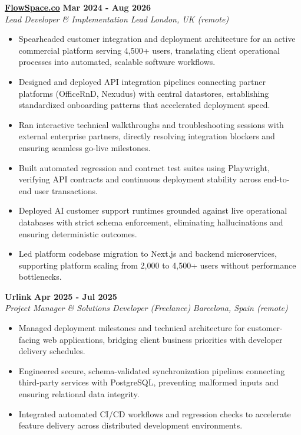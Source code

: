 \documentclass[10pt,a4paper]{article}
\newcommand{\role}[4]{%
  \textbf{#1} \hfill \textbf{#2}\\[1pt]%
  \textit{#3} \hfill \textit{#4}\\[2pt]%
}
\begin{document}
\role{\href{https://flowspace.co}{FlowSpace.co}}{Mar 2024 - Aug 2026}{Lead Developer \& Implementation Lead}{London, UK (remote)}
\begin{itemize}
  \item Spearheaded customer integration and deployment architecture for an active commercial platform serving 4,500+ users, translating client operational processes into automated, scalable software workflows.
  \item Designed and deployed API integration pipelines connecting partner platforms (OfficeRnD, Nexudus) with central datastores, establishing standardized onboarding patterns that accelerated deployment speed.
  \item Ran interactive technical walkthroughs and troubleshooting sessions with external enterprise partners, directly resolving integration blockers and ensuring seamless go-live milestones.
  \item Built automated regression and contract test suites using Playwright, verifying API contracts and continuous deployment stability across end-to-end user transactions.
  \item Deployed AI customer support runtimes grounded against live operational databases with strict schema enforcement, eliminating hallucinations and ensuring deterministic outcomes.
  \item Led platform codebase migration to Next.js and backend microservices, supporting platform scaling from 2,000 to 4,500+ users without performance bottlenecks.
\end{itemize}

\role{Urlink}{Apr 2025 - Jul 2025}{Project Manager \& Solutions Developer (Freelance)}{Barcelona, Spain (remote)}
\begin{itemize}
  \item Managed deployment milestones and technical architecture for customer-facing web applications, bridging client business priorities with developer delivery schedules.
  \item Engineered secure, schema-validated synchronization pipelines connecting third-party services with PostgreSQL, preventing malformed inputs and ensuring relational data integrity.
  \item Integrated automated CI/CD workflows and regression checks to accelerate feature delivery across distributed development environments.
\end{itemize}
\end{document}
